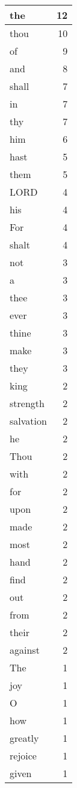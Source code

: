 \begin{center}
\begin{longtable}{l|r}
\hline \hline
\endlastfoot
the & 12 \\ \hline
thou & 10 \\ \hline
of & 9 \\ \hline
and & 8 \\ \hline
shall & 7 \\ \hline
in & 7 \\ \hline
thy & 7 \\ \hline
him & 6 \\ \hline
hast & 5 \\ \hline
them & 5 \\ \hline
LORD & 4 \\ \hline
his & 4 \\ \hline
For & 4 \\ \hline
shalt & 4 \\ \hline
not & 3 \\ \hline
a & 3 \\ \hline
thee & 3 \\ \hline
ever & 3 \\ \hline
thine & 3 \\ \hline
make & 3 \\ \hline
they & 3 \\ \hline
king & 2 \\ \hline
strength & 2 \\ \hline
salvation & 2 \\ \hline
he & 2 \\ \hline
Thou & 2 \\ \hline
with & 2 \\ \hline
for & 2 \\ \hline
upon & 2 \\ \hline
made & 2 \\ \hline
most & 2 \\ \hline
hand & 2 \\ \hline
find & 2 \\ \hline
out & 2 \\ \hline
from & 2 \\ \hline
their & 2 \\ \hline
against & 2 \\ \hline
The & 1 \\ \hline
joy & 1 \\ \hline
O & 1 \\ \hline
how & 1 \\ \hline
greatly & 1 \\ \hline
rejoice & 1 \\ \hline
given & 1 \\ \hline

\end{longtable}
\end{center}
